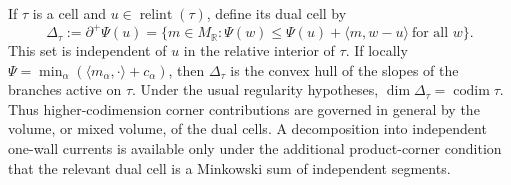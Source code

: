 \documentclass[10pt,a4paper]{amsart}
\theoremstyle{plain}
\theoremstyle{plain}
\numberwithin{equation}{section}
\begin{document}
If \(\tau\) is a cell and \(u\in\operatorname{relint}(\tau)\), define its
dual cell by
\[
\Delta_\tau:=\partial^+\Psi(u)
=\{m\in M_{\mathbb R}:\Psi(w)\leq
\Psi(u)+\langle m,w-u\rangle\ \text{for all }w\}.
\]
This set is independent of \(u\) in the relative interior of \(\tau\).  If
locally \(\Psi=\min_\alpha(\langle m_\alpha,\cdot\rangle+c_\alpha)\), then
\(\Delta_\tau\) is the convex hull of the slopes of the branches active on
\(\tau\).  Under the usual regularity hypotheses,
\(\dim\Delta_\tau=\operatorname{codim}\tau\).  Thus higher-codimension corner
contributions are governed in general by the volume, or mixed volume, of the
dual cells.  A decomposition into independent one-wall currents is available
only under the additional product-corner condition that the relevant dual
cell is a Minkowski sum of independent segments.
\end{document}
